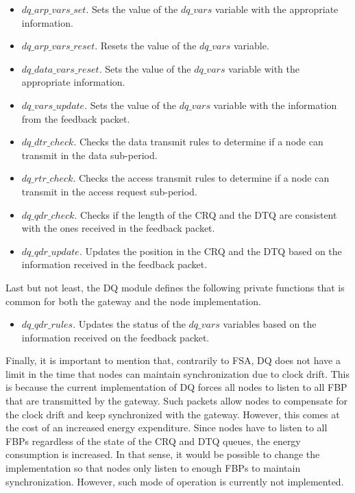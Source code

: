 \begin{itemize}
\item $dq\_arp\_vars\_set$. Sets the value of the $dq\_vars$ variable with the appropriate information.
\item $dq\_arp\_vars\_reset$. Resets the value of the $dq\_vars$ variable.
\item $dq\_data\_vars\_reset$. Sets the value of the $dq\_vars$ variable with the appropriate information.

\item $dq\_vars\_update$. Sets the value of the $dq\_vars$ variable with the information from the feedback packet.
\item $dq\_dtr\_check$. Checks the data transmit rules to determine if a node can transmit in the data sub-period.
\item $dq\_rtr\_check$. Checks the access transmit rules to determine if a node can transmit in the access request sub-period.
\item $dq\_qdr\_check$. Checks if the length of the CRQ and the DTQ are consistent with the ones received in the feedback packet.
\item $dq\_qdr\_update$. Updates the position in the CRQ and the DTQ based on the information received in the feedback packet.
\end{itemize}

Last but not least, the DQ module defines the following private functions that is common for both the gateway and the node implementation.
\begin{itemize}
\item $dq\_qdr\_rules$. Updates the status of the $dq\_vars$ variables based on the information received on the feedback packet.
\end{itemize}

Finally, it is important to mention that, contrarily to FSA, DQ does not have a limit in the time that nodes can maintain synchronization due to clock drift. This is because the current implementation of DQ forces all nodes to listen to all FBP that are transmitted by the gateway. Such packets allow nodes to compensate for the clock drift and keep synchronized with the gateway. However, this comes at the cost of an increased energy expenditure. Since nodes have to listen to all FBPs regardless of the state of the CRQ and DTQ queues, the energy consumption is increased. In that sense, it would be possible to change the implementation so that nodes only listen to enough FBPs to maintain synchronization. However, such mode of operation is currently not implemented.
